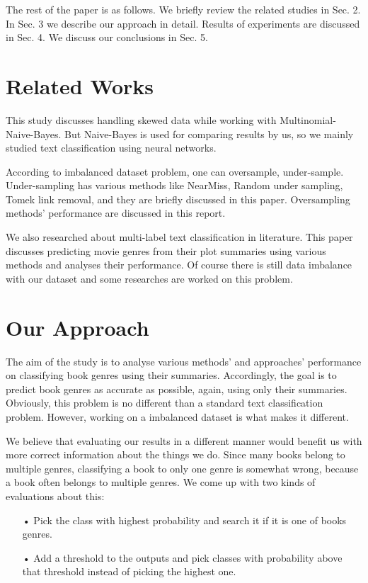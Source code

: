 \documentclass{article}
\begin{document}
The rest of the paper is as follows. We briefly review the related studies in Sec. 2. In Sec. 3 we describe our approach in detail. Results of experiments are discussed in Sec. 4. We discuss our conclusions in Sec. 5.

\section{Related Works}
This study \cite{ImbalancedNB} discusses handling skewed data while working with Multinomial-Naive-Bayes\cite{MNB}. But Naive-Bayes is used for comparing results by us, so we mainly studied text classification using neural networks\cite{ANN1}\cite{ANN2}.

According to imbalanced dataset problem, one can oversample\cite{resample}, under-sample\cite{resample}. Under-sampling has various methods like NearMiss, Random under sampling, Tomek link removal, and they are briefly discussed in this paper\cite{resamplep}. Oversampling methods' performance are discussed in this report\cite{over}. 

We also researched about multi-label text classification in literature. This paper\cite{movie} discusses predicting movie genres from their plot summaries using various methods and analyses their performance. Of course there is still data imbalance with our dataset\cite{ds}\cite{mli} and some researches are worked on this problem.

\section{Our Approach}
The aim of the study is to analyse various methods' and approaches' performance on classifying book genres using their summaries. Accordingly, the goal is to predict book genres as accurate as possible, again, using only their summaries. Obviously, this problem is no different than a standard text classification problem. However, working on a imbalanced dataset is what makes it different.

We believe that evaluating our results in a different manner would benefit us with more correct information about the things we do. Since many books belong to multiple genres, classifying a book to only one genre is somewhat wrong, because a book often belongs to multiple genres. We come up with two kinds of evaluations about this: 
\begin{itemize}
\item[•] Pick the class with highest probability and search it if it is one of books genres.
\item[•] Add a threshold to the outputs and pick classes with probability above that threshold instead of picking the highest one.
\end{itemize}
\end{document}

